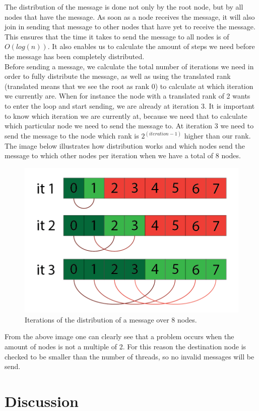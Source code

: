 \documentclass[a4paper,12px]{article}
\begin{document}
The distribution of the message is done not only by the root node, but by all
nodes that have the message. As soon as a node receives the message, it will
also join in sending that message to other nodes that have yet to receive the
message. This ensures that the time it takes to send the message to all nodes is
of $O(log(n))$. It also enables us to calculate the amount of steps we need
before the message has been completely distributed. \\

Before sending a message, we calculate the total number of iterations we need in
order to fully distribute the message, as well as using the translated rank
(translated means that we see the root as rank 0) to calculate at which
iteration we currently are. When for instance the node with a translated rank of
2 wants to enter the loop and start sending, we are already at iteration 3. It
is important to know which iteration we are currently at, because we need that
to calculate which particular node we need to send the message to. At iteration
3 we need to send the message to the node which rank is $2^{(iteration-1)}$
higher than our rank.\\

The image below illustrates how distribution works and which nodes send the
message to which other nodes per iteration when we have a total of 8 nodes.

\begin{figure}[H]
    \centering
    \includegraphics[width=\textwidth]{distribution}
    \caption{Iterations of the distribution of a message over 8 nodes.}
\end{figure}

From the above image one can clearly see that a problem occurs when the amount
of nodes is not a multiple of 2. For this reason the destination node is checked
to be smaller than the number of threads, so no invalid messages will be send.

\section{Discussion}



%
%
\end{document}
